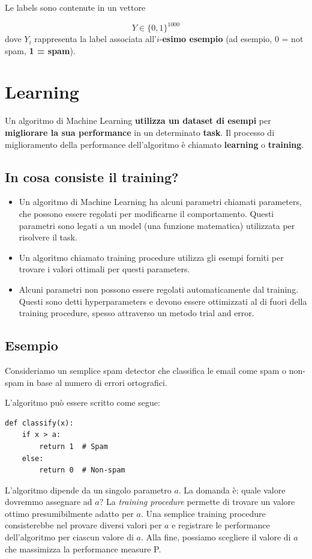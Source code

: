 \noindent
Le labels sono contenute in un vettore

$$ Y \in \{0,1\}^{1000} $$
dove $ Y_i $ rappresenta la label associata all’$i$-\textbf{esimo esempio} (ad esempio, 0 = not spam, \textbf{1 = spam}).

\section{Learning}

Un algoritmo di Machine Learning \textbf{utilizza un dataset di esempi} per \textbf{migliorare la sua performance} in un determinato \textbf{task}. Il processo di miglioramento della performance dell'algoritmo è chiamato \textbf{learning} o \textbf{training}.

\subsection{In cosa consiste il training?}

\begin{itemize}
\item Un algoritmo di Machine Learning ha alcuni parametri chiamati parameters, che possono essere regolati per modificarne il comportamento. Questi parametri sono legati a un model (una funzione matematica) utilizzata per risolvere il task.
\item Un algoritmo chiamato training procedure utilizza gli esempi forniti per trovare i valori ottimali per questi parameters.
\item Alcuni parametri non possono essere regolati automaticamente dal training. Questi sono detti hyperparameters e devono essere ottimizzati al di fuori della training procedure, spesso attraverso un metodo trial and error.
\end{itemize}

\subsection{Esempio}

Consideriamo un semplice spam detector che classifica le email come spam o non-spam in base al numero di errori ortografici. 

\noindent
L'algoritmo può essere scritto come segue:


\begin{lstlisting}[style=py,caption={Soglia sul numero di errori ortografici, chiaramente un approccio naive},label={lst:spam-threshold}]
def classify(x):
    if x > a:
        return 1  # Spam
    else:
        return 0  # Non-spam
\end{lstlisting}

\noindent
L'algoritmo dipende da un singolo parametro $a$. La domanda è: quale valore dovremmo assegnare ad $a$? La \emph{training procedure} permette di trovare un valore ottimo presumibilmente adatto per $a$.
\noindent
Una semplice training procedure consisterebbe nel provare diversi valori per $a$ e registrare le performance dell'algoritmo per ciascun valore di $a$. Alla fine, possiamo scegliere il valore di $a$ che massimizza la performance measure P.
